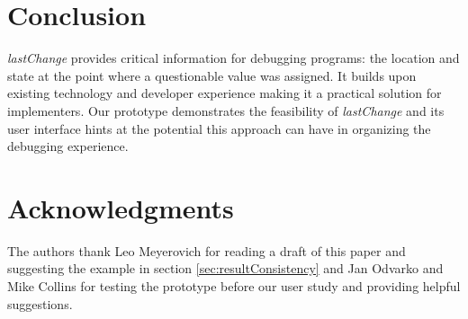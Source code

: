 \documentclass{sig-alternate}
\begin{document}


\section{Conclusion}
\textit{lastChange} provides critical information for debugging programs: the location and state at the point where a questionable value was assigned. It builds upon existing technology and developer experience making it a practical solution for implementers. Our prototype demonstrates the feasibility of \textit{lastChange} and its user interface hints at the potential this approach can have in organizing the debugging experience. 




\section{Acknowledgments}
The authors thank Leo Meyerovich for reading a draft of this paper and suggesting the example in section \ref{sec:resultConsistency} and
Jan Odvarko and Mike Collins for testing the prototype before our user study and providing helpful suggestions.
\end{document}
